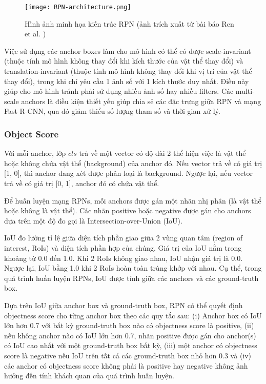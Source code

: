 \begin{figure}[h]
	\center
	\texttt{[image: RPN-architecture.png]}
	\caption{Hình ảnh minh họa kiến trúc RPN \textmd{(ảnh trích xuất từ bài báo Ren et al. \citep{ren2015faster})}}
	\label{fig:RPN-architecture}
\end{figure}

Việc sử dụng các anchor boxes làm cho mô hình có thể có được scale-invariant (thuộc tính mô hình không thay đổi khi kích thước của vật thể thay đổi) và translation-invariant (thuộc tính mô hình không thay đổi khi vị trí của vật thể thay đổi), trong khi chỉ yêu cầu 1 ảnh số với 1 kích thước duy nhất. Điều này giúp cho mô hình tránh phải sử dụng nhiều ảnh số hay nhiều filters. Các multi-scale anchors là điều kiện thiết yếu giúp chia sẻ các đặc trưng giữa RPN và mạng Fast R-CNN, qua đó giảm thiểu số lượng tham số và thời gian xử lý.

\subsubsection*{Object Score}
\label{obj-score}
Với mỗi anchor, lớp $cls$ trả về một vector có độ dài 2 thể hiện việc là vật thể hoặc không chứa vật thể (background) của anchor đó. Nếu vector trả về có giá trị [1, 0], thì anchor đang xét được phân loại là background. Ngược lại, nếu vector trả về có giá trị [0, 1], anchor đó có chứa vật thể.

Để huấn luyện mạng RPNs, mỗi anchors được gán một nhãn nhị phân (là vật thể hoặc không là vật thể). Các nhãn positive hoặc negative được gán cho anchors dựa trên một độ đo gọi là Intersection-over-Union (IoU).

IoU đo lường tỉ lệ giữa diện tích phần giao giữa 2 vùng quan tâm (region of interest, RoIs) và diện tích phần hợp của chúng. Giá trị của IoU nằm trong khoảng từ 0.0 đến 1.0. Khi 2 RoIs không giao nhau, IoU nhận giá trị là 0.0. Ngược lại, IoU bằng 1.0 khi 2 RoIs hoàn toàn trùng khớp với nhau. Cụ thể, trong quá trình huấn luyện RPNs, IoU được tính giữa các anchors và các ground-truth box.

Dựa trên IoU giữa anchor box và ground-truth box, RPN có thể quyết định objectness score cho từng anchor box theo các quy tắc sau: (i) Anchor box có IoU lớn hơn 0.7 với bất kỳ ground-truth box nào có objectness score là positive, (ii) nếu không anchor nào có IoU lớn hơn 0.7, nhãn positive được gán cho anchor(s) có IoU cao nhất với một ground-truth box bất kỳ, (iii) một anchor có objectness score là negative nếu IoU trên tất cả các ground-truth box nhỏ hơn 0.3 và (iv) các anchor có objectness score không phải là positive hay negative không ảnh hưởng đến tính khách quan của quá trình huấn luyện.

